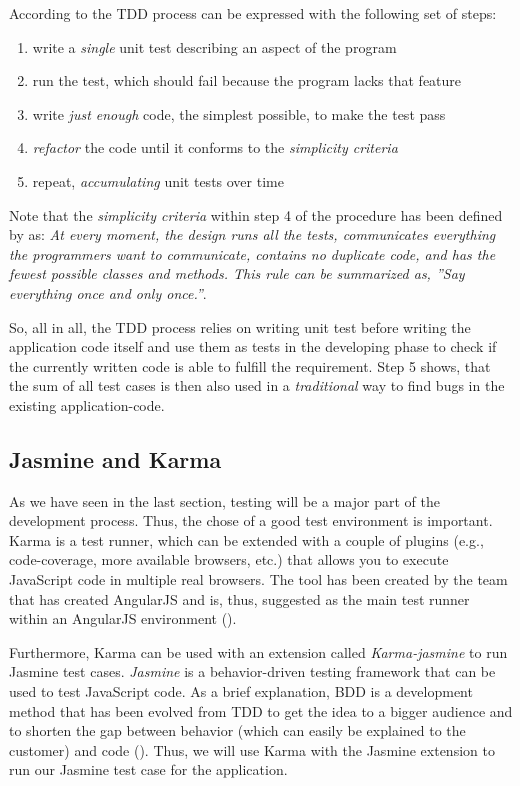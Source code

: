 According to \cite{GAA2015} the \ac{TDD} process can be expressed with the following set of steps:

\begin{enumerate}
  	\item write a \emph{single} unit test describing an aspect of the program
  	\item run the test, which should fail because the program lacks that feature
  	\item write \emph{just enough} code, the simplest possible, to make the test pass
	\item \emph{refactor} the code until it conforms to the \textit{simplicity criteria}
	\item repeat, \emph{accumulating} unit tests over time
\end{enumerate}

Note that the \textit{simplicity criteria} within step 4 of the procedure has been defined by \cite{Beck1999} as: \textit{At every moment, the design runs all the tests, communicates everything the programmers want to communicate, contains no duplicate code, and has the fewest possible classes and methods. This rule can be summarized as, ''Say everything once and only once.''}. 

So, all in all, the \ac{TDD} process relies on writing unit test before writing the application code itself and use them as tests in the developing phase to check if the currently written code is able to fulfill the requirement. Step 5 shows, that the sum of all test cases is then also used in a \textit{traditional} way to find bugs in the existing application-code. 

\subsection{Jasmine and Karma}
As we have seen in the last section, testing will be a major part of the development process. Thus, the chose of a good test environment is important. Karma is a test runner, which can be extended with a couple of plugins (e.g., code-coverage, more available browsers, etc.) that allows you to execute JavaScript code in multiple real browsers. The tool has been created by the team that has created AngularJS and is, thus, suggested as the main test runner within an AngularJS environment (\cite{7_github_2015}).  

Furthermore, Karma can be used with an extension called \emph{Karma-jasmine} to run Jasmine test cases. \emph{Jasmine} is a behavior-driven testing framework that can be used to test JavaScript code. As a brief explanation, \ac{BDD} is a development method that has been evolved from \ac{TDD} to get the idea to a bigger audience and to shorten the gap between behavior (which can easily be explained to the customer) and code (\cite{BDD}). Thus, we will use Karma with the Jasmine extension to run our Jasmine test case for the application.
 
